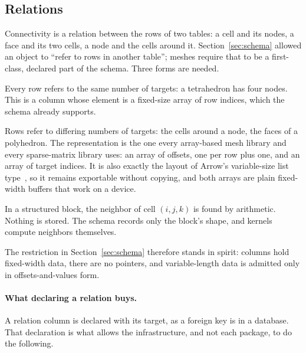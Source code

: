 \documentclass[11pt,a4paper]{article}
\begin{document}
\subsection{Relations}
\label{sec:relations}

Connectivity is a relation between the rows of two tables: a cell and its
nodes, a face and its two cells, a node and the cells around it.
Section~\ref{sec:schema} allowed an object to \enquote{refer to rows in
another table}; meshes require that to be a first-class, declared part of the
schema.  Three forms are needed.

\begin{description}[style=nextline,leftmargin=2em]
  \item[Fixed arity.]
        Every row refers to the same number of targets: a tetrahedron has four
        nodes.  This is a column whose element is a fixed-size array of row
        indices, which the schema already supports.
  \item[Variable arity.]
        Rows refer to differing numbers of targets: the cells around a node,
        the faces of a polyhedron.  The representation is the one every
        array-based mesh library and every sparse-matrix library uses: an
        array of offsets, one per row plus one, and an array of target
        indices.  It is also exactly the layout of Arrow's variable-size list
        type~\cite{arrowcolumnar}, so it remains exportable without copying,
        and both arrays are plain fixed-width buffers that work on a device.
  \item[Implicit.]
        In a structured block, the neighbor of cell $(i,j,k)$ is found by
        arithmetic.  Nothing is stored.  The schema records only the block's
        shape, and kernels compute neighbors themselves.
\end{description}

The restriction in Section~\ref{sec:schema} therefore stands in spirit:
columns hold fixed-width data, there are no pointers, and variable-length
data is admitted only in offsets-and-values form.

\paragraph{What declaring a relation buys.}  A relation column is declared
with its target, as a foreign key is in a database.  That declaration is what
allows the infrastructure, and not each package, to do the following.
\end{document}
